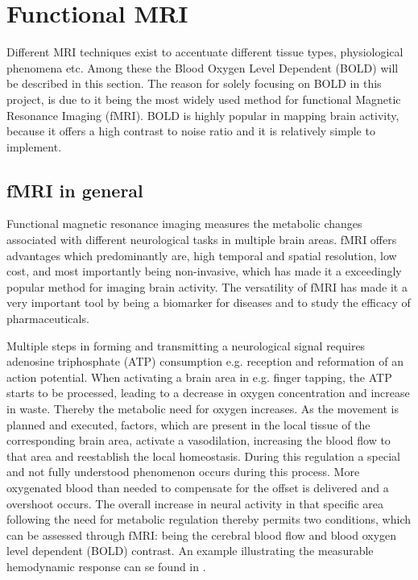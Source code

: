 \section{Functional MRI} \label{sec:fMRI}

Different MRI techniques exist to accentuate different tissue types, physiological phenomena etc. Among these the Blood Oxygen Level Dependent (BOLD) will be described in this section. The reason for solely focusing on BOLD in this project, is due to it being the most widely used method for functional Magnetic Resonance Imaging (fMRI). BOLD is highly popular in mapping brain activity, because it offers a high contrast to noise ratio and it is relatively simple to implement. \cite{Lee2002}    

\subsection{fMRI in general } 
Functional magnetic resonance imaging measures the metabolic changes associated with different neurological tasks in multiple brain areas. fMRI offers advantages which predominantly are, high temporal and spatial resolution, low cost, and most importantly being non-invasive, which has made it a exceedingly popular method for imaging brain activity. The versatility of fMRI has made it a very important tool by being a biomarker for diseases and to study the efficacy of pharmaceuticals. \cite{Glover2011} 

Multiple steps in forming and transmitting a neurological signal requires adenosine triphosphate (ATP) consumption e.g. reception and reformation of an action potential. When activating a brain area in e.g. finger tapping, the ATP starts to be processed, leading to a decrease in oxygen concentration and increase in waste. Thereby the metabolic need for oxygen increases. As the movement is planned and executed, factors, which are present in the local tissue of the corresponding brain area, activate a vasodilation, increasing the blood flow to that area and reestablish the local homeostasis. During this regulation a special and not fully understood phenomenon occurs during this process. More oxygenated blood than needed to compensate for the offset is delivered and a overshoot occurs. The overall increase in neural activity in that specific area following the need for metabolic regulation thereby permits two conditions, which can be assessed through fMRI: being the cerebral blood flow and blood oxygen level dependent (BOLD) contrast. An example illustrating the measurable hemodynamic response can se found in . \cite{Glover2011,Poldrack2011}

